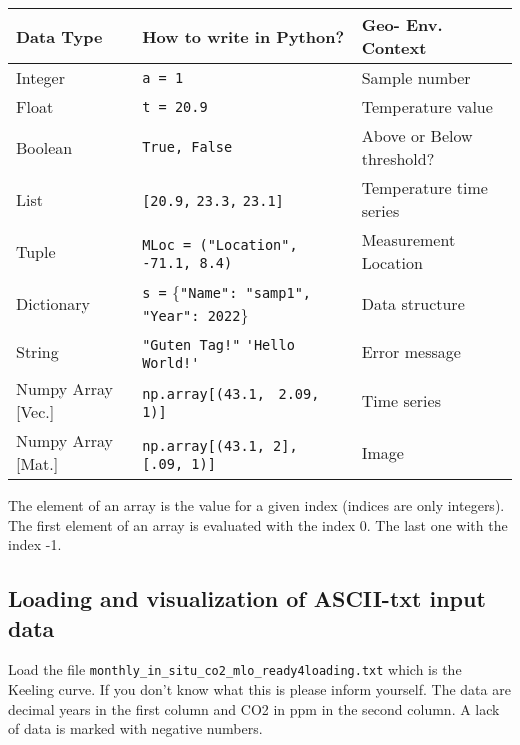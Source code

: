 \ifanswers
  \begin{tcolorbox}[enhanced jigsaw,breakable,pad at break*=1mm,
  colback=blue!5!white,colframe=babyblueeyes,title=Solutions,
  watermark color=white]
  \begin{center}
        \begin{tabularx}{\linewidth}{ X | X | X }
        \textbf{Data Type} & \textbf{How to write in Python?} & \textbf{Geo- Env. Context}\\
        \hline
        Integer & \verb|a = 1| & Sample number \\
        Float & \verb|t = 20.9| & Temperature value \\
        Boolean & \verb|True, False| & Above or Below threshold? \\
        List & \verb|[20.9,| \verb|23.3,| \verb|23.1]| & Temperature time series \\
        Tuple & \verb|MLoc = ("Location",| \verb| -71.1, 8.4)| & Measurement Location \\
        Dictionary & \verb|s =| \{\verb|"Name": "samp1",| \verb|"Year": 2022|\}  & Data structure\\
        String & \verb|"Guten Tag!"| \verb|'Hello World!'| & Error message \\
        Numpy Array [Vec.] & \verb|np.array[(43.1,| \verb| 2.09, 1)]| & Time series \\
        Numpy Array [Mat.] & \verb|np.array[(43.1, 2],| \verb| [.09, 1)]| & Image \\
      \end{tabularx}
    \end{center}
  The element of an array is the value for a given index (indices are only integers). The first element of an array is evaluated with the index 0. The last one with the index -1. 
  \end{tcolorbox}
\fi


\subsection{Loading and visualization of ASCII-txt input data}
\label{sec:viskeeling}

Load the file \verb|monthly_in_situ_co2_mlo_ready4loading.txt| which is the Keeling curve. If you don't know what this is please inform yourself. The data are decimal years in the first column and CO2 in ppm in the second column. A lack of data is marked with negative numbers.

